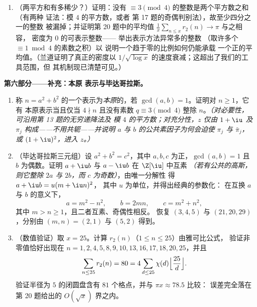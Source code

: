 \begin{problem}
\begin{enumerate}[resume]
        $\equiv 3$ 的因数的平均超出量：这是借算术计算出的分析。
  \item （两平方和有多稀少？）证明：没有
        $\equiv 3 \pmod 4$ 的整数是两个平方数之和（有两种
        证法：模 $4$ 的平方数，或者
        第 17 题的奇偶判别法），故至少四分之一的整数
        被漏掉；并证明第 20 题中的平均值 $\frac1x\sum_{n\leq
        x}r_2(n) \to \pi$ 与之相容，
        密度为 $0$ 的可表示整数——
        举出表示方法异常多的整数
        （取许多个 $\equiv 1 \bmod 4$ 的素数之积）以
        说明一个趋于零的比例如何仍能承载
        一个正的平均值。（兰道证明了真正的密度以
        $1/\sqrt{\log x}$ 的速度衰减；这超出了我们的工具范围，但
        其机制现已清楚可见。）
\end{enumerate}

\medskip
\noindent\textbf{第六部分——补充：本原
表示与毕达哥拉斯。}
\begin{enumerate}[resume]
  \item 称 $n = a^2 + b^2$ 的一个表示为\emph{本原}的，若
        $\gcd(a, b) = 1$。证明对 $n \geq 1$，它有
        本原表示当且仅当 $4 \nmid n$ 且没有素数
        $q \equiv 3 \pmod 4$ 整除 $n$。\emph{（对必要性，
        可沿用第 13 题的无穷递降法及
        模 $4$ 的平方数；对充分性，$z$ 仅由 $1 + \iu$
        及 $\pi_j$ 构成——不用共轭——并说明
        $a$ 与 $b$ 的公共素因子为何会迫使
        $\pi_j$ 与 $\bar\pi_j$，或 $(1+\iu)^2$，进入
        $z$。）}
  \item （毕达哥拉斯三元组）设 $a^2 + b^2 = c^2$，其中 $a, b,
        c$ 为正，$\gcd(a, b) = 1$ 且 $b$ 为偶数。证明
        $a + \iu b$ 与 $a - \iu b$ 在 $\Z[\iu]$ 中互素
        \emph{（若有公共的高斯，则它整除
        $2a$ 与 $2b$，而 $c$ 为奇数）}，由唯一分解性
        得 $a + \iu b = u(m + \iu n)^2$，
        其中 $u$ 为单位，并得出经典的参数化：
        在互换 $a$ 与 $b$ 的意义下，
        \[
        a = m^2 - n^2, \qquad b = 2mn, \qquad c = m^2 + n^2,
        \]
        其中 $m > n \geq 1$，且二者互素、奇偶性相反。
        恢复 $(3, 4, 5)$ 与 $(21, 20, 29)$，分别由 $(m, n) =
        (2, 1)$ 与 $(5, 2)$ 得到。
  \item （数值验证）取 $x = 25$。计算
        $r_2(n)$（$1 \leq n \leq 25$）由雅可比公式，
        验证非零值恰好出现在 $n = 1,
        2, 4, 5, 8, 9, 10, 13, 16, 17, 18, 20, 25$，并且
        \[
        \sum_{n \leq 25} r_2(n) = 80
        = 4\sum_{d \leq 25}\chi(d)
        \Bigl\lfloor\frac{25}d\Bigr\rfloor .
        \]
        验证半径为 $5$ 的闭圆盘含有 $81$
        个格点，并与 $\pi x \approx 78.5$ 比较：
        误差完全落在第
        20 题给出的 $O(\sqrt x)$ 界之内。
\end{enumerate}
\end{problem}
